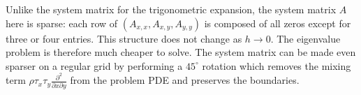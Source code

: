 \documentclass[10pt]{article}
\begin{document}
Unlike the system matrix for the trigonometric expansion, the system
matrix $A$ here is sparse: each row of $(A_{x,x}, A_{x,y}, A_{y,y})$
is composed of all zeros except for three or four entries. This
structure does not change as $h \to 0$. The eigenvalue problem is
therefore much cheaper to solve. The system matrix can be made even
sparser on a regular grid by performing a $45^{\circ}$ rotation which
removes the mixing term
$\rho\tau_x \tau_y\frac{\partial^2}{\partial x \partial y}$ from
the problem PDE and preserves the boundaries.


\end{document}

